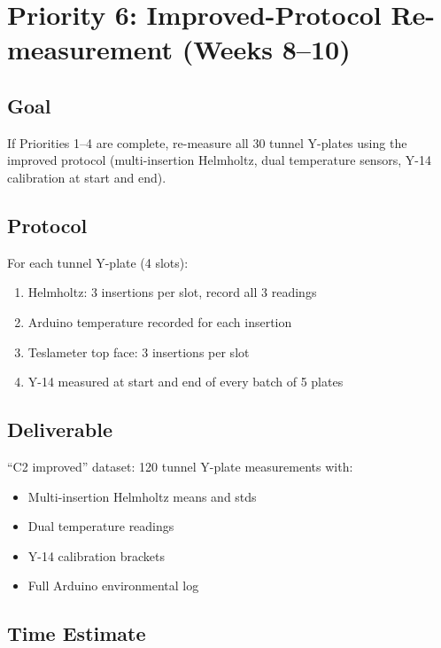 \documentclass[11pt,letterpaper]{article}
\begin{document}
\section{Priority 6: Improved-Protocol Re-measurement (Weeks 8--10)}
\label{sec:p6}

\subsection{Goal}

If Priorities 1--4 are complete, re-measure all 30 tunnel Y-plates using the
improved protocol (multi-insertion Helmholtz, dual temperature sensors, Y-14
calibration at start and end).

\subsection{Protocol}

For each tunnel Y-plate (4 slots):
\begin{enumerate}[nosep]
  \item Helmholtz: 3 insertions per slot, record all 3 readings
  \item Arduino temperature recorded for each insertion
  \item Teslameter top face: 3 insertions per slot
  \item Y-14 measured at start and end of every batch of 5 plates
\end{enumerate}

\subsection{Deliverable}

``C2 improved'' dataset: 120 tunnel Y-plate measurements with:
\begin{itemize}[nosep]
  \item Multi-insertion Helmholtz means and stds
  \item Dual temperature readings
  \item Y-14 calibration brackets
  \item Full Arduino environmental log
\end{itemize}

\subsection{Time Estimate}
\end{document}
